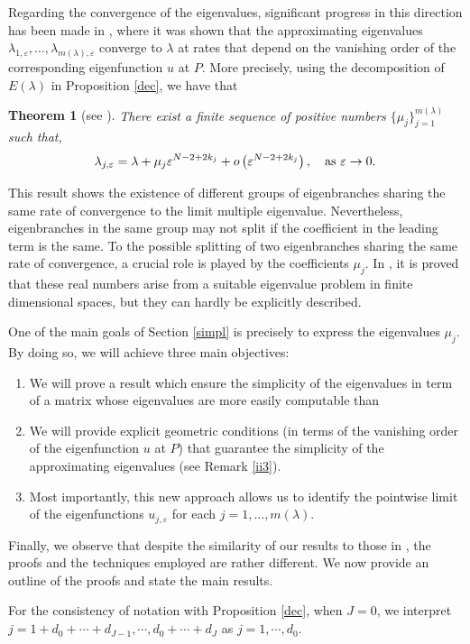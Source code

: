 \documentclass[11pt,reqno]{article}
\newtheorem{teo}{Theorem}[section]
\numberwithin{equation}{section}
\newcommand\e\varepsilon
\newcommand\la\lambda
\newcommand\q\quad
\begin{document}
 Regarding the convergence of the eigenvalues, significant progress in this direction has been made in \cite{alm1,alm2}, where it was shown that the approximating eigenvalues $\la_{1,\e}, \dots, \la_{m(\la),\e}$ converge to $\la$ at rates that depend on the vanishing order of the corresponding eigenfunction $u$ at $P$. More precisely, using the decomposition of $E(\la)$ in Proposition \ref{dec}, we have that
\begin{teo}[see \cite{alm1,alm2}]
 There exist a finite sequence of positive numbers $\{\mu_j\}_{j=1}^{m(\lambda)}$ such that, 
$$
\lambda_{j,\e}=\lambda+\mu_{j}\e^{N-2+2k_j}+o\left(\e^{N-2+2k_j}\right),\q \hbox{as }\e\to 0.
$$
\end{teo}
This result shows the existence of different groups of eigenbranches sharing the same rate of convergence to the limit multiple eigenvalue. Nevertheless, eigenbranches in the same group may not split if  the coefficient in the leading term is the same. 
To the possible splitting of two eigenbranches sharing the same rate of convergence, a crucial role is played by the coefficients $\mu_j$. In \cite{alm2026}, it is proved that these real numbers arise from a suitable eigenvalue problem in finite dimensional spaces, but they can hardly be explicitly described. 

One of the main goals of Section \ref{simpl} is precisely to express the eigenvalues $\mu_j$. By doing so, we will achieve three main objectives:
\begin{enumerate}
    \item We will prove a result which ensure the simplicity of the eigenvalues in term of a matrix whose eigenvalues are more easily computable than \cite{alm2026}
    \item We will provide explicit geometric conditions (in terms of the vanishing order of the eigenfunction $u$ at $P$) that guarantee the simplicity of the approximating eigenvalues (see Remark \ref{ii3}).
    \item Most importantly, this new approach allows us to identify the pointwise limit of the eigenfunctions $u_{j,\e}$ for each $j = 1, \dots, m(\lambda)$.
\end{enumerate}
Finally, we observe that despite the similarity of our results to those in \cite{alm1,alm2}, the proofs and the techniques employed are rather different. We now provide an outline of the proofs and state the main results.

For the consistency of notation with Proposition \ref{dec}, when $J=0$, we interpret $j=1+d_0+\cdots+d_{J-1},\cdots,d_0+\cdots+d_J$ as $j=1,\cdots,d_0$.
\end{document}
